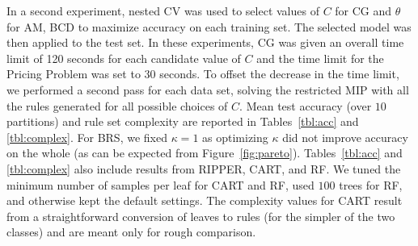 \documentclass[twoside,11pt]{article}
\begin{document}
In a second experiment, nested CV was used to select values of $C$ for CG and $\theta$ for AM, BCD to maximize accuracy on each training set. The selected model was then applied to the test set.  
In these experiments, CG was given an overall time limit of 120 seconds for each candidate value of $C$ and the time limit for  the Pricing Problem was set to 30 seconds.
To offset the decrease in the time limit, we performed a second pass for each data set, solving the restricted MIP with all the rules generated for all possible choices of $C$.
Mean test accuracy (over $10$ partitions) and rule set complexity are reported in Tables~\ref{tbl:acc} and \ref{tbl:complex}.  For BRS, we fixed $\kappa = 1$ as optimizing $\kappa$ did not improve accuracy on the whole (as can be expected from Figure~\ref{fig:pareto}).  Tables~\ref{tbl:acc} and \ref{tbl:complex} also include results from RIPPER, CART, and RF.  We tuned the minimum number of samples per leaf for CART and RF, used $100$ trees for RF, and otherwise kept the default settings. The complexity values for CART result from a straightforward conversion of leaves to rules (for the simpler of the two classes) and are meant only for rough comparison.
\end{document}
